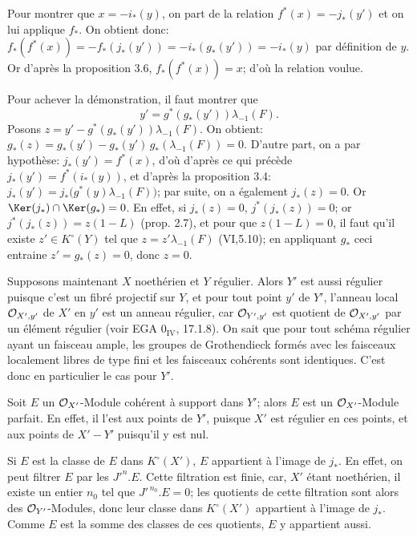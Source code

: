 Pour montrer que \(x=-i_*(y)\), on part de la relation \(f^*(x)=-j_*(y')\) et on lui applique \(f_*\). On obtient donc: \(f_*(f^*(x))=-f_*(j_*(y'))=-i_*(g_*(y'))=-i_*(y)\) par définition de \(y\). Or d'après la proposition 3.6, \(f_*(f^*(x))=x\); d'où la relation voulue.

Pour achever la démonstration, il faut montrer que
\[
y'=g^*(g_*(y'))\lambda_{-1}(F).
\]
Posons \(z=y'-g^*(g_*(y'))\lambda_{-1}(F)\). On obtient: \(g_*(z)=g_*(y')-g_*(y')\,g_*(\lambda_{-1}(F))=0\). D'autre part, on a par hypothèse: \(j_*(y')=f^*(x)\), d'où d'après ce qui précède \(j_*(y')=f^*(i_*(y))\), et d'après la proposition 3.4: \(j_*(y')=j_*\bigl(g^*(y)\lambda_{-1}(F)\bigr)\); par suite, on a également \(j_*(z)=0\). Or \(\Ker(j_*)\cap\Ker(g_*)=0\). En effet, si \(j_*(z)=0\), \(j^*(j_*(z))=0\); or \(j^*(j_*(z))=z(1-L)\) (prop. 2.7), et pour que \(z(1-L)=0\), il faut qu'il existe \(z'\in K^\circ(Y)\) tel que \(z=z'\lambda_{-1}(F)\) (VI,5.10); en appliquant \(g_*\) ceci entraine \(z'=g_*(z)=0\), donc \(z=0\).

Supposons maintenant \(X\) noethérien et \(Y\) régulier. Alors \(Y'\) est aussi régulier puisque c'est un fibré projectif sur \(Y\), et pour tout point \(y'\) de \(Y'\), l'anneau local \(\mathcal O_{X',y'}\) de \(X'\) en \(y'\) est un anneau régulier, car \(\mathcal O_{Y',y'}\) est quotient de \(\mathcal O_{X',y'}\) par un élément régulier (voir EGA \(0_{\mathrm{IV}}\), 17.1.8). On
sait que pour tout schéma régulier ayant un faisceau ample, les groupes de Grothendieck formés avec les faisceaux localement libres de type fini et les faisceaux cohérents sont identiques. C'est donc en particulier le cas pour \(Y'\).

Soit \(E\) un \(\mathcal O_{X'}\)-Module cohérent à support dans \(Y'\); alors \(E\) est un \(\mathcal O_{X'}\)-Module parfait. En effet, il l'est aux points de \(Y'\), puisque \(X'\) est régulier en ces points, et aux points de \(X'-Y'\) puisqu'il y est nul.

Si \(E\) est la classe de \(E\) dans \(K^\circ(X')\), \(E\) appartient à l'image de \(j_*\). En effet, on peut filtrer \(E\) par les \(J'^n.E\). Cette filtration est finie, car, \(X'\) étant noethérien, il existe un entier \(n_0\) tel que \(J'^{\,n_0}.E=0\); les quotients de cette filtration sont alors des \(\mathcal O_{Y'}\)-Modules, donc leur classe dans \(K^\circ(X')\) appartient à l'image de \(j_*\). Comme \(E\) est la somme des classes de ces quotients, \(E\) y appartient aussi.

